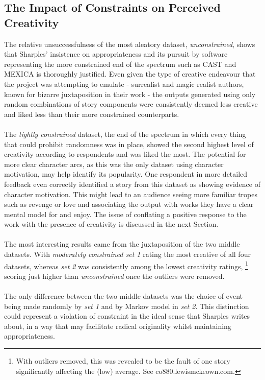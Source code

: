 \documentclass[letterpaper]{article}
\begin{document}
\subsection{The Impact of Constraints on Perceived Creativity}
The relative unsuccessfulness of the most aleatory dataset, \emph{unconstrained}, shows that Sharples' insistence on appropriateness and its pursuit by software representing the more constrained end of the spectrum such as CAST and MEXICA is thoroughly justified. Even given the type of creative endeavour that the project was attempting to emulate - surrealist and magic realist authors, known for bizarre juxtaposition in their work - the outputs generated using only random combinations of story components were consistently deemed less creative and liked less than their more constrained counterparts.\\ 
\\The \emph{tightly constrained} dataset, the end of the spectrum in which every thing that could prohibit randomness was in place, showed the second highest level of creativity according to respondents and was liked the most. The potential for more clear character arcs, as this was the only dataset using character motivation, may help identify its popularity. One respondent in more detailed feedback even correctly identified a story from this dataset as showing evidence of character motivation. This might lead to an audience seeing more familiar tropes such as revenge or love and associating the output with works they have a clear mental model for and enjoy. The issue of conflating a positive response to the work with the presence of creativity is discussed in the next Section.\\
\\The most interesting results came from the juxtaposition of the two middle datasets. With \emph{moderately constrained set 1} rating the most creative of all four datasets, whereas \emph{set 2} was consistently among the lowest creativity ratings, \footnote{With outliers removed, this was revealed to be the fault of one story significantly affecting the (low) average. See co880.lewismckeown.com.} scoring just higher than \emph{unconstrained} once the outliers were removed.\\
\\The only difference between the two middle datasets was the choice of event being made randomly by \emph{set 1} and by Markov model in \emph{set 2}. This distinction could represent a violation of constraint in the ideal sense that Sharples writes about, in a way that may facilitate radical originality whilst maintaining appropriateness.\\
\end{document}
